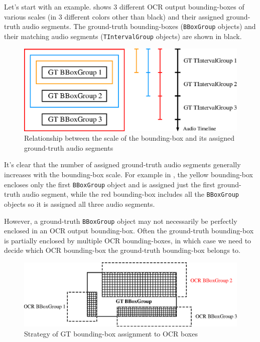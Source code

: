 Let's start with an example.  shows 3 different OCR output bounding-boxes of various scales (in 3 different colors other than black) and their assigned ground-truth audio segments. The ground-truth bounding-boxes (\texttt{BBoxGroup} objects) and their matching audio segments (\texttt{TIntervalGroup} objects) are shown in black. 

\begin{figure}[!tb]
    \centering
    \includegraphics[width=.8\textwidth]{eval-align-scale.eps}
    \caption{Relationship between the scale of the bounding-box and its assigned ground-truth audio segments}
    \label{fig:eval-align-scale}
\end{figure}

It's clear that the number of assigned ground-truth audio segments generally increases with the bounding-box scale. For example in , the yellow bounding-box encloses only the first \texttt{BBoxGroup} object and is assigned just the first ground-truth audio segment, while the red bounding-box includes all the \texttt{BBoxGroup} objects so it is assigned all three audio segments.

However, a ground-truth \texttt{BBoxGroup} object may not necessarily be perfectly enclosed in an OCR output bounding-box. Often the ground-truth bounding-box is partially enclosed by multiple OCR bounding-boxes, in which case we need to decide which OCR bounding-box the ground-truth bounding-box belongs to.

\begin{figure}[!htb]
    \centering
    \includegraphics[width=.8\textwidth]{eval-gt-assign.eps}
    \caption{Strategy of GT bounding-box assignment to OCR boxes}
    \label{fig:eval-gt-assign}
\end{figure}

